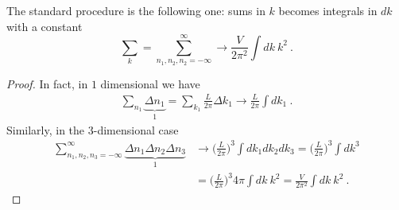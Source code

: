    The standard procedure is the following one: sums in $k$ becomes integrals in $dk$ with a constant
    \begin{equation}\label{tdlim}
        \sum_k = \sum_{n_1, n_2, n_2 = -\infty}^\infty \rightarrow \frac{V}{2\pi^2} \int dk~k^2 ~.
    \end{equation}
    \begin{proof}
        In fact, in $1$ dimensional we have 
        \begin{equation*}
        \begin{aligned}
            \sum_{n_1} \underbrace{\Delta n_1}_1 = \sum_{k_1} \frac{L}{2\pi} \Delta k_1 \rightarrow \frac{L}{2\pi} \int dk_1 ~.
        \end{aligned}
        \end{equation*}
        Similarly, in the $3$-dimensional case
        \begin{equation*}
        \begin{aligned}
            \sum_{n_1, n_2, n_3=- \infty}^\infty \underbrace{\Delta n_1 \Delta n_2 \Delta n_3}_1 & \rightarrow \Big ( \frac{L}{2\pi} \Big)^3 \int dk_1 dk_2 dk_3 = \Big ( \frac{L}{2\pi} \Big)^3 \int dk^3 \\ & = \Big ( \frac{L}{2\pi} \Big)^3 4 \pi \int dk ~ k^2 = \frac{V}{2\pi^2} \int dk~k^2 ~. 
        \end{aligned}
        \end{equation*}
    \end{proof}

